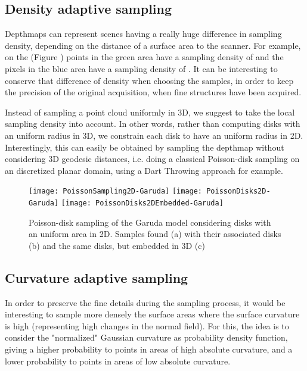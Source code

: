 \subsection{Density adaptive sampling}
Depthmaps can represent scenes having a really huge difference in sampling density, depending on the distance of a surface area to the scanner. 
For example, on the (Figure ) points in the green area have a sampling density of  and the pixels in the blue area have a sampling density of . It can be interesting to conserve that difference of density when choosing the samples, in order to keep the precision of the original acquisition, when fine structures have been acquired.

Instead of sampling a point cloud uniformly in 3D, we suggest to take the local sampling density into account. In other words, rather than computing disks with an uniform radius in 3D, we constrain each disk to have an uniform radius in 2D.
Interestingly, this can easily be obtained by sampling the depthmap without considering 3D geodesic distances, i.e. doing a classical Poisson-disk sampling on an discretized planar domain, using a Dart Throwing approach for example.

\begin{figure}[ht]
\centering
\texttt{[image: PoissonSampling2D-Garuda]}
\texttt{[image: PoissonDisks2D-Garuda]}
\texttt{[image: PoissonDisks2DEmbedded-Garuda]}
\caption{Poisson-disk sampling of the Garuda model considering disks with an uniform area in 2D. Samples found (a) with their associated disks (b) and the same disks, but embedded in 3D (c)}
\label{fig:poisson_sampling_2d}
\end{figure}

\subsection{Curvature adaptive sampling}
In order to preserve the fine details during the sampling process, it would be interesting to sample more densely the surface areas where the surface curvature is high (representing high changes in the normal field). For this, the idea is to consider the "normalized" Gaussian curvature as probability density function, giving a higher probability to points in areas of high absolute curvature, and a lower probability to points in areas of low absolute curvature.

